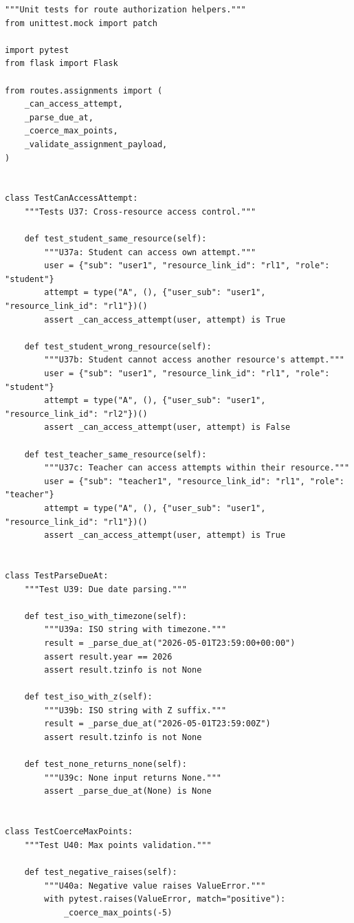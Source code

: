 \documentclass[12pt, letterpaper]{article}
\begin{document}
\begin{lstlisting}[style=pythonstyle]
"""Unit tests for route authorization helpers."""
from unittest.mock import patch

import pytest
from flask import Flask

from routes.assignments import (
    _can_access_attempt,
    _parse_due_at,
    _coerce_max_points,
    _validate_assignment_payload,
)


class TestCanAccessAttempt:
    """Tests U37: Cross-resource access control."""

    def test_student_same_resource(self):
        """U37a: Student can access own attempt."""
        user = {"sub": "user1", "resource_link_id": "rl1", "role": "student"}
        attempt = type("A", (), {"user_sub": "user1", "resource_link_id": "rl1"})()
        assert _can_access_attempt(user, attempt) is True

    def test_student_wrong_resource(self):
        """U37b: Student cannot access another resource's attempt."""
        user = {"sub": "user1", "resource_link_id": "rl1", "role": "student"}
        attempt = type("A", (), {"user_sub": "user1", "resource_link_id": "rl2"})()
        assert _can_access_attempt(user, attempt) is False

    def test_teacher_same_resource(self):
        """U37c: Teacher can access attempts within their resource."""
        user = {"sub": "teacher1", "resource_link_id": "rl1", "role": "teacher"}
        attempt = type("A", (), {"user_sub": "user1", "resource_link_id": "rl1"})()
        assert _can_access_attempt(user, attempt) is True


class TestParseDueAt:
    """Test U39: Due date parsing."""

    def test_iso_with_timezone(self):
        """U39a: ISO string with timezone."""
        result = _parse_due_at("2026-05-01T23:59:00+00:00")
        assert result.year == 2026
        assert result.tzinfo is not None

    def test_iso_with_z(self):
        """U39b: ISO string with Z suffix."""
        result = _parse_due_at("2026-05-01T23:59:00Z")
        assert result.tzinfo is not None

    def test_none_returns_none(self):
        """U39c: None input returns None."""
        assert _parse_due_at(None) is None


class TestCoerceMaxPoints:
    """Test U40: Max points validation."""

    def test_negative_raises(self):
        """U40a: Negative value raises ValueError."""
        with pytest.raises(ValueError, match="positive"):
            _coerce_max_points(-5)


\end{lstlisting}
\end{document}

